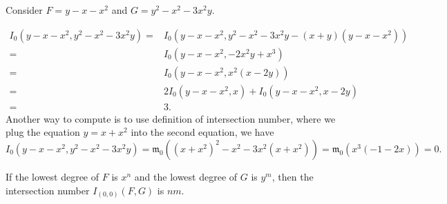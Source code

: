 \documentclass[10pt]{article}
\begin{document}
\begin{example}
  Consider $ F = y - x - x^{2}$ and $ G = y^{2} - x^{2} - 3 x^{2}y$.
\end{example}
\begin{solution}
  \begin{equation*}
    \begin{aligned}
      I_{0}(y-x- x^{2} , y^{2} - x^{2} - 3 x^{2}y) = & I_{0}(y - x - x^{2} , y^{2} - x^{2} - 3 x^{2}y - (x+y)(y - x - x^{2})) \\
      = & I_{0}(y - x - x^{2} , - 2 x^{2}y + x^{3}) \\
      = & I_0(y - x - x^{2}, x^{2} (x - 2y)) \\
      = & 2 I_0(y - x - x^{2}, x) + I_0(y - x - x^{2}, x - 2y) \\
      = & 3.
    \end{aligned}
  \end{equation*}
  Another way to compute is to use definition of intersection number, where we plug the equation $ y = x+x^{2}$ into the second equation, we have
  \begin{equation*}
    I_{0}(y - x - x^{2} , y^{2} - x^{2} - 3 x^{2}y) = \mathfrak{m}_0\left( (x+x^{2})^{2} - x^{2} - 3 x^{2}(x+x^{2}) \right) = \mathfrak{m}_0 \left( x^{3}(-1-2x) \right) = 0.
  \end{equation*}
\end{solution}

\begin{proposition}
  If the lowest degree of $ F$ is $ x^{n}$ and the lowest degree of $ G$ is $ y^{m}$, then the intersection number $ I_{(0,0)}(F,G)$ is $ nm$.
\end{proposition}
\end{document}
